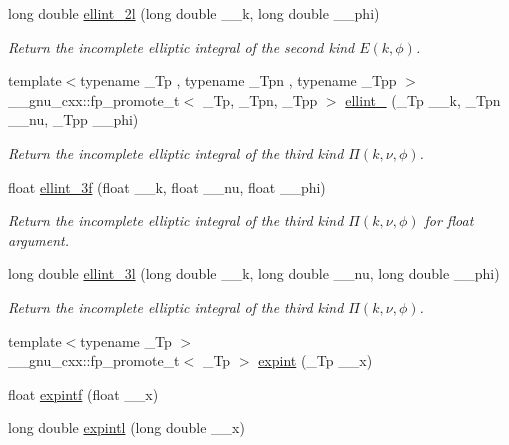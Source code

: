 \begin{DoxyCompactItemize}
long double \hyperlink{group__mathsf__std_ga5c791332d374a809d8ca16c69a1a30f5}{ellint\+\_\+2l} (long double \+\_\+\+\_\+k, long double \+\_\+\+\_\+phi)
\begin{DoxyCompactList}\small\item\em Return the incomplete elliptic integral of the second kind $ E(k,\phi) $. \end{DoxyCompactList}\item 
{\footnotesize template$<$typename \+\_\+\+Tp , typename \+\_\+\+Tpn , typename \+\_\+\+Tpp $>$ }\\\+\_\+\+\_\+gnu\+\_\+cxx\+::fp\+\_\+promote\+\_\+t$<$ \+\_\+\+Tp, \+\_\+\+Tpn, \+\_\+\+Tpp $>$ \hyperlink{group__mathsf__std_gaac0240d1e7e401e652b9d1adf4c7e029}{ellint\+\_} (\+\_\+\+Tp \+\_\+\+\_\+k, \+\_\+\+Tpn \+\_\+\+\_\+nu, \+\_\+\+Tpp \+\_\+\+\_\+phi)
\begin{DoxyCompactList}\small\item\em Return the incomplete elliptic integral of the third kind $ \Pi(k,\nu,\phi) $. \end{DoxyCompactList}\item 
float \hyperlink{group__mathsf__std_ga1a80bd2c15bc9fbecda2630a9e9409e7}{ellint\+\_\+3f} (float \+\_\+\+\_\+k, float \+\_\+\+\_\+nu, float \+\_\+\+\_\+phi)
\begin{DoxyCompactList}\small\item\em Return the incomplete elliptic integral of the third kind $ \Pi(k,\nu,\phi) $ for {\ttfamily float} argument. \end{DoxyCompactList}\item 
long double \hyperlink{group__mathsf__std_gaa8c0e5864df8769021a7f3e21a30c5d2}{ellint\+\_\+3l} (long double \+\_\+\+\_\+k, long double \+\_\+\+\_\+nu, long double \+\_\+\+\_\+phi)
\begin{DoxyCompactList}\small\item\em Return the incomplete elliptic integral of the third kind $ \Pi(k,\nu,\phi) $. \end{DoxyCompactList}\item 
{\footnotesize template$<$typename \+\_\+\+Tp $>$ }\\\+\_\+\+\_\+gnu\+\_\+cxx\+::fp\+\_\+promote\+\_\+t$<$ \+\_\+\+Tp $>$ \hyperlink{group__mathsf__std_ga0e9ac717a106ef54184b5f058c451782}{expint} (\+\_\+\+Tp \+\_\+\+\_\+x)
\item 
float \hyperlink{group__mathsf__std_ga5842816f6eed2594e0a327df4e4a2a47}{expintf} (float \+\_\+\+\_\+x)
\item 
long double \hyperlink{group__mathsf__std_ga1329130b32328d0666e290ee5931fa4f}{expintl} (long double \+\_\+\+\_\+x)

\end{DoxyCompactItemize}
